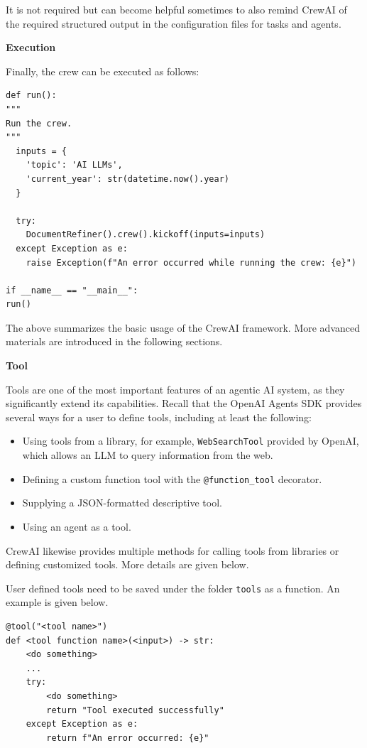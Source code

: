 It is not required but can become helpful sometimes to also remind CrewAI of the required structured output in the configuration files for tasks and agents.

\vspace{0.1in}
\noindent \textbf{Execution}
\vspace{0.1in}

Finally, the crew can be executed as follows:
\begin{lstlisting}
def run():
"""
Run the crew.
"""
  inputs = {
	'topic': 'AI LLMs',
	'current_year': str(datetime.now().year)
  }

  try:
    DocumentRefiner().crew().kickoff(inputs=inputs)
  except Exception as e:
    raise Exception(f"An error occurred while running the crew: {e}")

if __name__ == "__main__":
run()
\end{lstlisting}

The above summarizes the basic usage of the CrewAI framework. More advanced materials are introduced in the following sections.

\vspace{0.1in}
\noindent \textbf{Tool}
\vspace{0.1in}

Tools are one of the most important features of an agentic AI system, as they significantly extend its capabilities. Recall that the OpenAI Agents SDK provides several ways for a user to define tools, including at least the following:
\begin{itemize}
	\item Using tools from a library, for example, \verb|WebSearchTool| provided by OpenAI, which allows an LLM to query information from the web.
	\item Defining a custom function tool with the \verb|@function_tool| decorator.
	\item Supplying a JSON-formatted descriptive tool.
	\item Using an agent as a tool.
\end{itemize}

CrewAI likewise provides multiple methods for calling tools from libraries or defining customized tools. More details are given below.

User defined tools need to be saved under the folder \texttt{tools} as a function. An example is given below.
\begin{lstlisting}
@tool("<tool name>")
def <tool function name>(<input>) -> str:
    <do something>
    ...
    try:
        <do something>
        return "Tool executed successfully"
    except Exception as e:
        return f"An error occurred: {e}"
\end{lstlisting}


